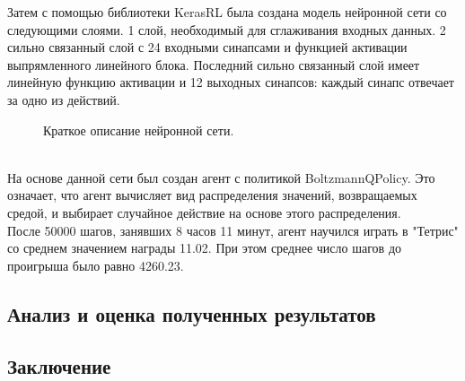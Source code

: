 \documentclass{article}
\begin{document}
Затем с помощью библиотеки KerasRL была создана модель нейронной сети со следующими слоями. 1 слой, необходимый для сглаживания входных данных. 2 сильно связанный слой с 24 входными синапсами и функцией активации выпрямленного линейного блока. Последний сильно связанный слой имеет линейную функцию активации и 12 выходных синапсов: каждый синапс отвечает за одно из действий.\\
\begin{figure}[h]
\caption{Краткое описание нейронной сети.}
\label{ris:image}
\end{figure}\\
На основе данной сети был создан агент с политикой BoltzmannQPolicy. Это означает, что агент вычисляет вид распределения значений, возвращаемых средой, и выбирает случайное действие на основе этого распределения.\\
После 50000 шагов, занявших 8 часов 11 минут, агент научился играть в "Тетрис" со среднем значением награды 11.02. При этом среднее число шагов до проигрыша было равно 4260.23.\\
\newpage
\begin{center}
\section {Анализ и оценка полученных результатов}
\end{center}
\newpage
\begin{center}
\section {Заключение}
\end{center}
\end{document}
